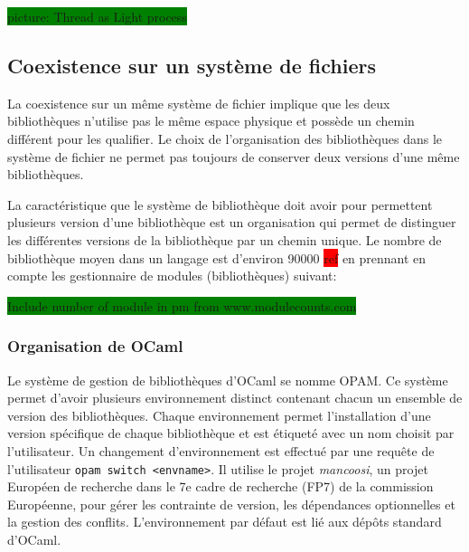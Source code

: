 \documentclass[12pt,initial,twoside,maitrise]{dms}
\newcommand{\todo}[1]{\noindent\colorbox{green}{#1\hspace{\textwidth}}}
\numberwithin{equation}{section}
\numberwithin{table}{chapter}
\numberwithin{figure}{chapter}
\begin{document}
\todo{picture: Thread as Light process}




\subsection{Coexistence sur un système de fichiers}
La coexistence sur un même système de fichier implique que les deux
bibliothèques n'utilise pas le même espace physique et possède un chemin
différent pour les qualifier. Le choix de l'organisation des bibliothèques
dans le système de fichier ne permet pas toujours de conserver deux versions
d'une même bibliothèques.

La caractéristique que le système de bibliothèque doit avoir pour permettent
plusieurs version d'une bibliothèque est un organisation qui permet de distinguer
les différentes versions de la bibliothèque par un chemin unique.
Le nombre de bibliothèque moyen dans un langage est d'environ 90000 \colorbox{red}{ref}
en prennant en compte les gestionnaire de modules (bibliothèques) suivant:

\todo{Include number of module in pm from www.modulecounts.com}


\subsubsection{Organisation de OCaml}
Le système de gestion de bibliothèques d'OCaml se nomme OPAM. Ce système permet d'avoir
plusieurs environnement distinct contenant chacun un ensemble de version des bibliothèques.
Chaque environnement permet l'installation d'une version spécifique de chaque bibliothèque et
est étiqueté avec un nom choisit par l'utilisateur. Un changement d'environnement est
effectué par une requête de l'utilisateur \verb|opam switch <envname>|. Il utilise
le projet \textit{mancoosi}, un projet Européen de recherche dans le 7e cadre de recherche (FP7)
de la commission Européenne, pour gérer les contrainte de version, les dépendances optionnelles
et la gestion des conflits. L'environnement par défaut est lié aux dépôts standard d'OCaml.
\end{document}
